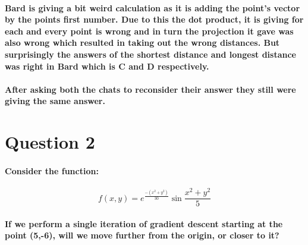 \documentclass[11pt]{article} %
\begin{document}
\paragraph{\textbf{Bard} is giving a bit weird calculation as it is adding the point’s vector by the points first number. Due to this the dot product, it is giving for each and every point is wrong and in turn the projection it gave was also wrong which resulted in taking out the wrong distances. But surprisingly the answers of the shortest distance and longest distance was right in Bard which is C and D respectively.}

\paragraph{After asking both the chats to reconsider their answer they still were giving the same answer.}


% 
% 
% 
% 
% 
% 
% 
% 
% 
% 
% 
% 
% 
% 
% 
% 
% 
% 
% 
% 
% 
% 
% 
% 
% 
% 
% 
% 
\newpage
\section{Question 2}
\paragraph{Consider the function: }
$$ f(x,y)=e^{\frac{-(x^2+y^2)}{30}} \sin \frac{x^2+y^2}{5} $$
\paragraph{If we perform a single iteration of gradient descent starting at the point (5,-6), will we move further from the origin, or closer to it?}
% 
% 
% 
% 
% 
% 
% 
% 
% 
% 
\end{document}
